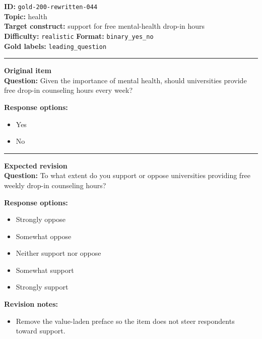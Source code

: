 \documentclass[10pt,a4paper]{article}
\newcommand{\sectionline}{\vspace{0.15em}\hrule\vspace{0.35em}}
\begin{document}
\begin{tcolorbox}[colframe=FlawRed,colback=white,colbacktitle=FlawRed!9,coltitle=black,title={Item 044\hfill Flawed item}]
\textbf{ID:} \texttt{gold-200-rewritten-044}\\
\textbf{Topic:} health\\
\textbf{Target construct:} support for free mental-health drop-in hours\\
\textbf{Difficulty:} \texttt{realistic} \quad \textbf{Format:} \texttt{binary\_yes\_no}\\
\textbf{Gold labels:} \texttt{leading\_question}\\
\sectionline
\textbf{Original item}\\
\textbf{Question:} Given the importance of mental health, should universities provide free drop-in counseling hours every week?
\par\textbf{Response options:}
\begin{itemize}
\item Yes
\item No
\end{itemize}
\sectionline
\textbf{Expected revision}\\
\textbf{Question:} To what extent do you support or oppose universities providing free weekly drop-in counseling hours?
\par\textbf{Response options:}
\begin{itemize}
\item Strongly oppose
\item Somewhat oppose
\item Neither support nor oppose
\item Somewhat support
\item Strongly support
\end{itemize}
\par\textbf{Revision notes:}
\begin{itemize}
\item Remove the value-laden preface so the item does not steer respondents toward support.
\end{itemize}
\end{tcolorbox}
\end{document}
